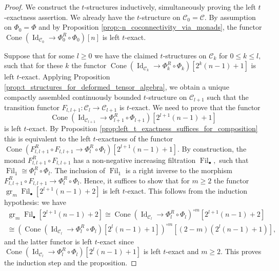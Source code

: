 \documentclass[11pt,leqno]{amsart}
\numberwithin{equation}{section}
\def\gr{\operatorname{gr}}
\newcommand{\Cone}{\operatorname{Cone}}
\newcommand{\Fil}{\operatorname{Fil}}
\newcommand{\cC}{{\mathcal C}}
\newcommand{\Id}{\operatorname{Id}}
\begin{document}
\begin{proof}
We construct the $t$-structures inductively, simultaneously proving the left $t$-exactness assertion. We already have the $t$-structure on $\cC_0=\cC.$ By assumption on $\Phi_0=\Phi$ and by Proposition \ref{prop:-n_coconnectivity_via_monads}, the functor $\Cone(\Id_{\cC_0}\to \Phi_0^R\circ\Phi_0)[n]$ is left $t$-exact. 

Suppose that for some $l\geq 0$ we have the claimed $t$-structures on $\cC_k$ for $0\leq k\leq l,$ such that for these $k$ the functor $\Cone(\Id_{\cC_k}\to\Phi_k^R\circ\Phi_k)[2^k(n-1)+1]$ is left $t$-exact. Applying Proposition \ref{prop:t_structures_for_deformed_tensor_algebra}, we obtain a unique compactly assembled continuously bounded $t$-structure on $\cC_{l+1}$ such that the transition functor $F_{l,l+1}:\cC_l\to\cC_{l+1}$ is $t$-exact. We need to prove that the functor 
\begin{equation*}
\Cone(\Id_{\cC_{l+1}}\to \Phi_{l+1}^R\circ \Phi_{l+1})[2^{l+1}(n-1)+1]
\end{equation*} is left $t$-exact. By Proposition \ref{prop:left_t_exactness_suffices_for_composition} this is equivalent to the left $t$-exactness of the functor $\Cone(F_{l,l+1}^R\circ F_{l,l+1}\to \Phi_l^R\circ\Phi_l)[2^{l+1}(n-1)+1].$ By construction, the monad $F_{l,l+1}^R\circ F_{l,l+1}$ has a non-negative increasing filtration $\Fil_{\bullet},$ such that $\Fil_1\cong \Phi_l^R\circ \Phi_l.$ The inclusion of $\Fil_1$ is a right inverse to the morphism $F_{l,l+1}^R\circ F_{l,l+1}\to \Phi_l^R\circ\Phi_l.$ Hence, it suffices to show that for $m\geq 2$ the functor $\gr_m \Fil_{\bullet}[2^{l+1}(n-1)+2]$ is left $t$-exact. This follows from the induction hypothesis: we have
\begin{multline*}
\gr_m \Fil_{\bullet}[2^{l+1}(n-1)+2]\cong \Cone(\Id_{\cC_l}\to \Phi_l^R\circ\Phi_l)^{\circ m}[2^{l+1}(n-1)+2]\\
\cong (\Cone(\Id_{\cC_l}\to \Phi_l^R\circ\Phi_l)[2^l(n-1)+1])^{\circ m}[(2-m)(2^l(n-1)+1)],
\end{multline*} and the latter functor is left $t$-exact since $\Cone(\Id_{\cC_l}\to \Phi_l^R\circ\Phi_l)[2^l(n-1)+1]$ is left $t$-exact and $m\geq 2.$ This proves the induction step and the proposition. 
\end{proof}
\end{document}
